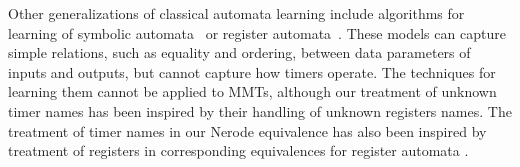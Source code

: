 Other generalizations of classical automata learning include algorithms for
learning of symbolic automata~\cite{MensM15,Drews:tacas17}
or register automata~\cite{BLP:remember,HoStMe2011,HowarSJC12,CasselHJS16}.
These models
can capture simple relations, such as equality and ordering,
between data parameters of inputs and outputs, but cannot capture how
timers operate. The techniques for learning them cannot be applied to
MMTs, although our treatment of unknown timer names has been inspired by
their handling of unknown registers names.
The treatment of timer names in our Nerode equivalence has also been inspired
by treatment of registers in corresponding equivalences for register automata
\cite{CasselHJMS15}.
